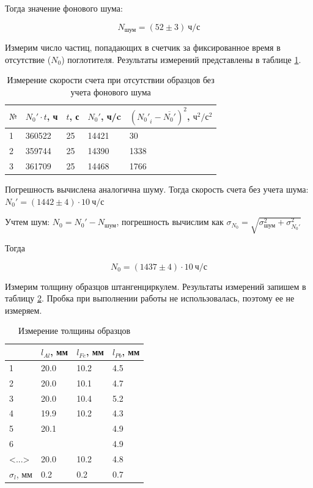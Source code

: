 \documentclass[a4paper,12pt]{article}
\begin{document}
Тогда значение фонового шума:

\begin{equation*}
    N_\text{шум} = (52 \pm 3 ) \ \text{ч}/\text{с}
\end{equation*}

Измерим число частиц, попадающих в счетчик за фиксированное время в отсутствие ($N_0$) поглотителя. Результаты измерений представлены в таблице \ref{table:3}.

\FloatBarrier
\begin{table}[!ht]
    \centering
    \begin{tabular}{|l|l|l|l|l|}
        \hline
        $№$ & $N_0' \cdot t$, ч & $t$, с & $N_0'$, ч/c & $\left({N_0'}_i - \overline{N_0'}\right)^2$, $\text{ч}^2/\text{с}^2$ \\ \hline
        1   & 360522  & 25 & 14421 & 30 \\ \hline
        2   & 359744  & 25 & 14390 & 1338  \\ \hline
        3   & 361709  & 25 & 14468 & 1766   \\ \hline
    \end{tabular}
    \caption{Измерение скорости счета при отсутствии образцов без учета фонового шума}
    \label{table:3}
\end{table}
\FloatBarrier

Погрешность вычислена аналогична шуму. Тогда скорость счета без учета шума: $N_0' = (1442 \pm 4) \cdot 10 \ \text{ч}/\text{с}$

Учтем шум: $N_0 = N_0' - N_\text{шум}$, погрешность вычислим как $\sigma_{N_0} = \sqrt{\sigma^2_\text{шум} + \sigma^2_{N_0'}}$

Тогда

\begin{equation*}
    N_0 = (1437 \pm 4) \cdot 10 \ \text{ч}/\text{с}
\end{equation*}

Измерим толщину образцов штангенциркулем. Результаты измерений запишем в таблицу \ref{table:4}. Пробка при выполнении работы не использовалась, поэтому ее не измеряем.

\FloatBarrier
\begin{table}[!ht]
    \centering
    \begin{tabular}{|l|l|l|l|}
        \hline
        ~ & $l_{Al}$, мм & $l_{Fe}$, мм & $l_{Pb}$, мм \\ \hline
        1 & 20.0 & 10.2 & 4.5 \\ \hline
        2 & 20.0 & 10.1 & 4.7 \\ \hline
        3 & 20.0 & 10.4 & 5.2 \\ \hline
        4 & 19.9 & 10.2 & 4.3 \\ \hline
        5 & 20.1 & ~    & 4.9 \\ \hline
        6 &  ~   &    ~ & 4.9 \\ \hline
        <...> & 20.0 & 10.2 & 4.8 \\ \hline
        $\sigma_l$, мм & 0.2 & 0.2 & 0.7 \\ \hline
    \end{tabular}
    \caption{Измерение толщины образцов}
    \label{table:4}
\end{table}
\FloatBarrier
\end{document}
